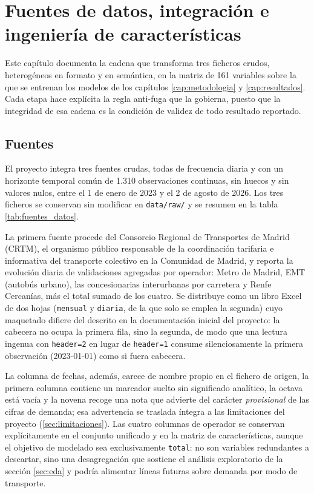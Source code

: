 \chapter{Fuentes de datos, integración e ingeniería de características}\label{cap:datos_features}

Este capítulo documenta la cadena que transforma tres ficheros crudos, heterogéneos en
formato y en semántica, en la matriz de 161 variables sobre la que se entrenan los modelos
de los capítulos \ref{cap:metodologia} y \ref{cap:resultados}. Cada etapa hace explícita
la regla anti-fuga que la gobierna, puesto que la integridad de esa cadena es la condición
de validez de todo resultado reportado.

\section{Fuentes}\label{sec:fuentes_datos}

El proyecto integra tres fuentes crudas, todas de frecuencia diaria y con un horizonte
temporal común de 1.310 observaciones continuas, sin huecos y sin valores nulos, entre el
1 de enero de 2023 y el 2 de agosto de 2026. Los tres ficheros se conservan sin modificar
en \texttt{data/\allowbreak{}raw/} y se resumen en la tabla \ref{tab:fuentes_datos}.

La primera fuente procede del Consorcio Regional de Transportes de Madrid (CRTM), el
organismo público responsable de la coordinación tarifaria e informativa del transporte
colectivo en la Comunidad de Madrid, y reporta la evolución diaria de validaciones
agregadas por operador: Metro de Madrid, EMT (autobús urbano), las concesionarias
interurbanas por carretera y Renfe Cercanías, más el total sumado de los cuatro. Se
distribuye como un libro Excel de dos hojas (\texttt{mensual} y \texttt{diaria}, de la que
solo se emplea la segunda) cuyo maquetado difiere del descrito en la documentación inicial
del proyecto: la cabecera no ocupa la primera fila, sino la segunda, de modo que una
lectura ingenua con \texttt{header=2} en lugar de \texttt{header=1} consume
silenciosamente la primera observación (2023-01-01) como si fuera cabecera.

La columna de fechas, además, carece de nombre propio en el fichero de origen, la primera
columna contiene un marcador suelto sin significado analítico, la octava está vacía y la
novena recoge una nota que advierte del carácter \emph{provisional} de las cifras de
demanda; esa advertencia se traslada íntegra a las limitaciones del proyecto
(\ref{sec:limitaciones}). Las cuatro columnas de operador se conservan explícitamente en
el conjunto unificado y en la matriz de características, aunque el objetivo de modelado
sea exclusivamente \texttt{total}: no son variables redundantes a descartar, sino una
desagregación que sostiene el análisis exploratorio de la sección \ref{sec:eda} y podría
alimentar líneas futuras sobre demanda por modo de transporte.

